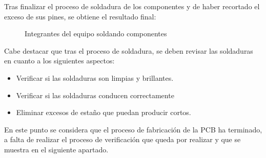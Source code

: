 \begin{itemize}
    Tras finalizar el proceso de soldadura de los componentes y de haber recortado el exceso de sus pines, se obtiene el resultado final:

    
    \begin{figure}[H]
    \centering
    \caption{Integrantes del equipo soldando componentes}
    \label{fig:lego}
    \end{figure}
    
    Cabe destacar que tras el proceso de soldadura, se deben revisar las soldaduras en cuanto a los siguientes aspectos:
    \begin{itemize}
        \item Verificar si las soldaduras son limpias y brillantes.
        \item Verificar si las soldaduras conducen correctamente
        \item Eliminar excesos de estaño que puedan producir cortos.
    \end{itemize}
\end{itemize}

En este punto se considera que el proceso de fabricación de la \ac{PCB} ha terminado, a falta de realizar el proceso de verificación que queda por realizar y que se muestra en el siguiente apartado.

